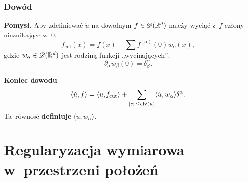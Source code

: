 \documentclass[10pt,t]{beamer}
\begin{document}
\begin{frame}
  \frametitle{Dowód}


  \textbf{Pomysł.}
  Aby zdefiniować $\dot{ u }$ na dowolnym $f \in \mathcal{D}( \mathbb{R}^{ d } )$ należy
  wyciąć z~$f$ człony nieznikające w~0.
  \begin{equation}
    \label{eq:Epstein-Glaser-11}
    f_{ \textrm{cut} }( x ) =
    f( x ) - \sum f^{ ( \alpha ) }( 0 ) w_{ \alpha }( x ),
  \end{equation}
  gdzie $w_{ \alpha } \in \mathcal{D}( \mathbb{R}^{ d } )$ jest rodziną funkcji
  „wycinających”:
  \begin{equation}
    \label{eq:Epstein-Glaser-12}
    \partial_{ \alpha } w_{ \beta }( 0 ) = \delta^{ \alpha }_{ \beta }.
  \end{equation}

  \vspace{\spaceFour}



  \textbf{Koniec dowodu}
  \begin{equation}
    \label{eq:Epstein-Glaser-13}
    \langle \dot{ u }, f \rangle =
    \langle u, f_{ \textrm{cut} } \rangle
    + \sum\limits_{ | \alpha | \leq \textrm{div}( u ) }
    \langle \dot{ u }, w_{ \alpha } \rangle \delta^{ \alpha }.
  \end{equation}
  Ta~równość \textbf{definiuje} $\langle \dot{ u }, w_{ \alpha } \rangle$.

\end{frame}










\section{Regularyzacja wymiarowa w~przestrzeni położeń}
\end{document}

